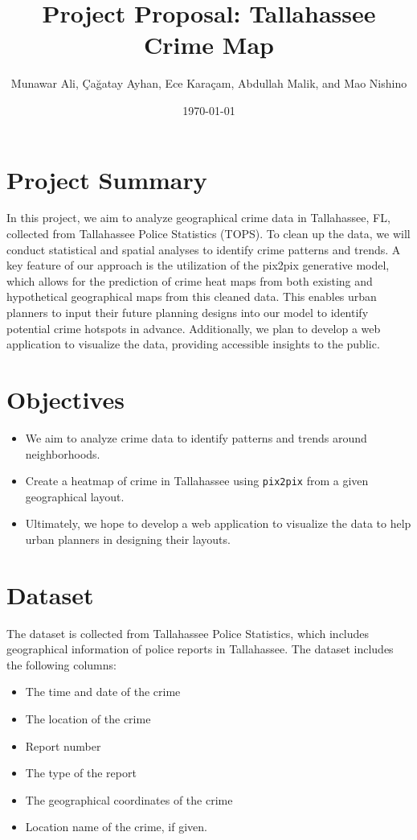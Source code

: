 \documentclass[10pt]{article}
\title{Project Proposal: Tallahassee Crime Map}
\author{Munawar Ali, Çağatay Ayhan, Ece Karaçam, Abdullah Malik, and Mao Nishino}
\date{\today}
\begin{document}
\maketitle

\section{Project Summary}
In this project, we aim to analyze geographical crime data in Tallahassee, FL, collected from Tallahassee Police Statistics (TOPS). To clean up the data, we will conduct statistical and spatial analyses to identify crime patterns and trends. A key feature of our approach is the utilization of the pix2pix generative model, which allows for the prediction of crime heat maps from both existing and hypothetical geographical maps from this cleaned data. This enables urban planners to input their future planning designs into our model to identify potential crime hotspots in advance. Additionally, we plan to develop a web application to visualize the data, providing accessible insights to the public.

\section{Objectives}
\begin{itemize}
    \item We aim to analyze crime data to identify patterns and trends around neighborhoods.
    \item Create a heatmap of crime in Tallahassee using \verb|pix2pix| from a given geographical layout.
    \item Ultimately, we hope to develop a web application to visualize the data to help urban planners in designing their layouts.
\end{itemize}

\section{Dataset}
The dataset is collected from Tallahassee Police Statistics, which includes geographical information of police reports in Tallahassee. The dataset includes the following columns:
\begin{itemize}
    \item The time and date of the crime
    \item The location of the crime
    \item Report number
    \item The type of the report
    \item The geographical coordinates of the crime
    \item Location name of the crime, if given.
\end{itemize}
\end{document}
